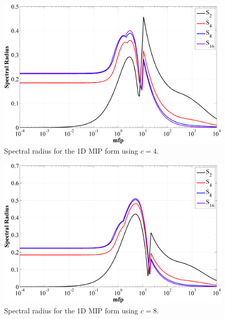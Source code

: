 \begin{figure}
\centering
\includegraphics[width=\textwidth]{figures/appendices/DSA_1D_SI_MIP_C=4.png}
\caption{Spectral radius for the 1D MIP form using $c=4$.}
\label{fig::1D_MIP_c=4}
\end{figure}

\begin{figure}
\centering
\includegraphics[width=\textwidth]{figures/appendices/DSA_1D_SI_MIP_C=8.png}
\caption{Spectral radius for the 1D MIP form using $c=8$.}
\label{fig::1D_MIP_c=8}
\end{figure}

